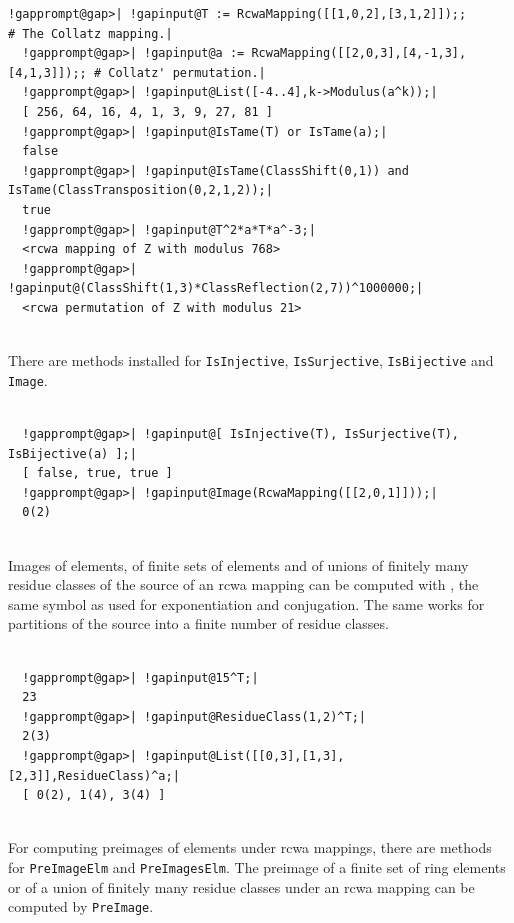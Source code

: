 \documentclass[a4paper,11pt]{report}
\begin{document}
{{\begin{Verbatim}[commandchars=!@|,fontsize=\small,frame=single,label=Example]
  !gapprompt@gap>| !gapinput@T := RcwaMapping([[1,0,2],[3,1,2]]);;          # The Collatz mapping.|
  !gapprompt@gap>| !gapinput@a := RcwaMapping([[2,0,3],[4,-1,3],[4,1,3]]);; # Collatz' permutation.|
  !gapprompt@gap>| !gapinput@List([-4..4],k->Modulus(a^k));|
  [ 256, 64, 16, 4, 1, 3, 9, 27, 81 ]
  !gapprompt@gap>| !gapinput@IsTame(T) or IsTame(a);|
  false
  !gapprompt@gap>| !gapinput@IsTame(ClassShift(0,1)) and IsTame(ClassTransposition(0,2,1,2));|
  true
  !gapprompt@gap>| !gapinput@T^2*a*T*a^-3;|
  <rcwa mapping of Z with modulus 768>
  !gapprompt@gap>| !gapinput@(ClassShift(1,3)*ClassReflection(2,7))^1000000;|
  <rcwa permutation of Z with modulus 21>
  
\end{Verbatim}
     There are methods installed for \texttt{IsInjective}, \texttt{IsSurjective}, \texttt{IsBijective} and \texttt{Image}. 
\begin{Verbatim}[commandchars=!@|,fontsize=\small,frame=single,label=Example]
  
  !gapprompt@gap>| !gapinput@[ IsInjective(T), IsSurjective(T), IsBijective(a) ];|
  [ false, true, true ]
  !gapprompt@gap>| !gapinput@Image(RcwaMapping([[2,0,1]]));|
  0(2)
  
\end{Verbatim}
  Images of elements, of finite sets of elements and of unions of finitely many
residue classes of the source of an rcwa mapping can be computed with \texttt{\texttt{}}, the same symbol as used for exponentiation and conjugation. The same works
for partitions of the source into a finite number of residue classes. 
\begin{Verbatim}[commandchars=!@|,fontsize=\small,frame=single,label=Example]
  
  !gapprompt@gap>| !gapinput@15^T;|
  23
  !gapprompt@gap>| !gapinput@ResidueClass(1,2)^T;|
  2(3)
  !gapprompt@gap>| !gapinput@List([[0,3],[1,3],[2,3]],ResidueClass)^a;|
  [ 0(2), 1(4), 3(4) ]
  
\end{Verbatim}
     For computing preimages of elements under rcwa mappings, there are methods for \texttt{PreImageElm} and \texttt{PreImagesElm}. The preimage of a finite set of ring elements or of a union of finitely many
residue classes under an rcwa mapping can be computed by \texttt{PreImage}. 
\begin{Verbatim}[commandchars=!@|,fontsize=\small,frame=single,label=Example]
  

\end{Verbatim}}}
\end{document}
